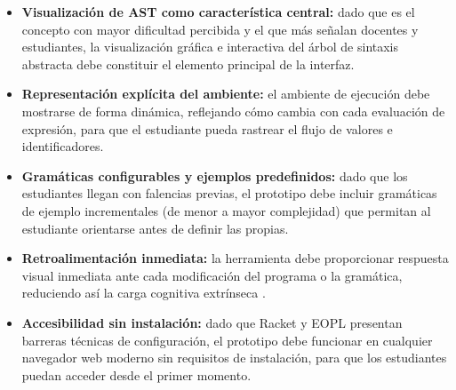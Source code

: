 \begin{itemize}
    \item \textbf{Visualización de AST como característica central:} dado que es el concepto con mayor dificultad percibida y el que más señalan docentes y estudiantes, la visualización gráfica e interactiva del árbol de sintaxis abstracta debe constituir el elemento principal de la interfaz.

    \item \textbf{Representación explícita del ambiente:} el ambiente de ejecución debe mostrarse de forma dinámica, reflejando cómo cambia con cada evaluación de expresión, para que el estudiante pueda rastrear el flujo de valores e identificadores.

    \item \textbf{Gramáticas configurables y ejemplos predefinidos:} dado que los estudiantes llegan con falencias previas, el prototipo debe incluir gramáticas de ejemplo incrementales (de menor a mayor complejidad) que permitan al estudiante orientarse antes de definir las propias.

    \item \textbf{Retroalimentación inmediata:} la herramienta debe proporcionar respuesta visual inmediata ante cada modificación del programa o la gramática, reduciendo así la carga cognitiva extrínseca \cite{SWELLER1988257, sweller2024cognitive}.

    \item \textbf{Accesibilidad sin instalación:} dado que Racket y EOPL presentan barreras técnicas de configuración, el prototipo debe funcionar en cualquier navegador web moderno sin requisitos de instalación, para que los estudiantes puedan acceder desde el primer momento.
\end{itemize}
